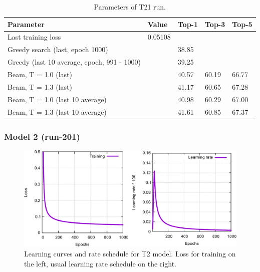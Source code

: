 \documentclass{article}
\begin{document}
\begin{table}[h!]
\caption{Parameters of T21 run.}
  \centering
  \begin{tabular}{p{8.2cm}p{1.5cm}p{1.5cm}p{1.5cm}p{1.5cm}}
    \toprule
    Parameter & Value & Top-1 & Top-3 & Top-5 \\
    \midrule
    Last training loss & 0.05108 & & & \\
    \midrule
    Greedy search (last, epoch 1000) & & 38.85 & & \\
    Greedy (last 10 average, epoch, 991 - 1000) & & 39.25 & & \\
    \midrule
    Beam, T = 1.0 (last) & & 40.57 &60.19  & 66.77 \\
    Beam, T = 1.3 (last) & & 41.17 & 60.65 &  67.28 \\ 
    \midrule
    Beam, T = 1.0 (last 10 average) & & 40.98 & 60.29 & 67.00 \\
    Beam, T = 1.3 (last 10 average) & &  41.61 & 60.85 & 67.37 \\ 
    \bottomrule
  \end{tabular}
  \label{tbl:t11}

\end{table} 

\newpage
 \subsubsection{Model 2 (run-201)}
 
\begin{figure}[h!]
  \centering
  \includegraphics[width = 16.5cm]{images/t2-2.pdf}
  \caption{Learning curves and rate schedule for T2 model. Loss for training on the left, usual learning rate schedule on the right.}
  \label{fig:t21}
\end{figure}
\end{document}
